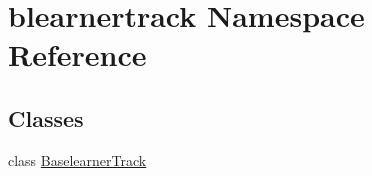 \hypertarget{namespaceblearnertrack}{}\section{blearnertrack Namespace Reference}
\label{namespaceblearnertrack}
\subsection*{Classes}
\begin{DoxyCompactItemize}
\item 
class \mbox{\hyperlink{classblearnertrack_1_1_baselearner_track}{Baselearner\+Track}}
\end{DoxyCompactItemize}
